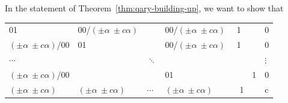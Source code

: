 \documentclass[12pt]{article}
\begin{document}
In the statement of Theorem~\ref{thm:qary-building-up}, we want to show that
\begin{center}
\begin{tabular}{|lllll|}
\toprule
 01   & 00/$(\pm \alpha  ~\pm c\alpha )$  &  & 00/$(\pm \alpha  ~\pm  c\alpha )$ ~~1  &  0 \\
 $(\pm \alpha  ~\pm c\alpha  )$/00   & 01  &  & 00/$(\pm \alpha  ~\pm c \alpha  )$ ~~1  &  0 \\
 $\cdots$ &   &  $\ddots$ &   & $\vdots$ \\
 $(\pm \alpha ~\pm c \alpha )$/00   &   &   & 01 ~~~~~~~~~~~~~~~~~~1  &  0 \\
 $(\pm \alpha  ~\pm c \alpha )$ & $(\pm \alpha  ~\pm c\alpha )$  & $\cdots$ & $(\pm \alpha  ~\pm c \alpha )$  ~~~~~ 1 &  c \\
\bottomrule
\end{tabular}
\end{center}
\end{document}
